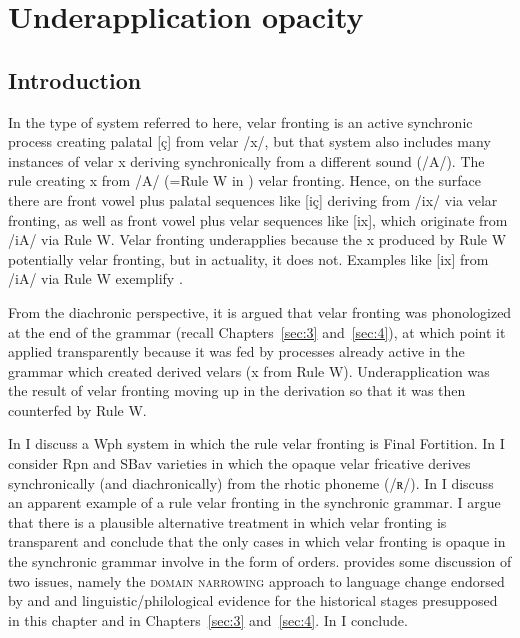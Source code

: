 \chapter{Underapplication opacity}\label{sec:5}

\section{Introduction}\label{sec:5.1}

In the type of system referred to here, velar fronting is an active synchronic process creating palatal [ç] from velar /x/, but that system also includes many instances of velar {\textbar}x{\textbar} deriving synchronically from a different sound (/A/). The rule creating {\textbar}x{\textbar} from /A/ (=Rule W in )  velar fronting. Hence, on the surface there are front vowel plus palatal sequences like [iç] deriving from /ix/ via velar fronting, as well as front vowel plus velar sequences like [ix], which originate from /iA/ via Rule W. Velar fronting underapplies because the {\textbar}x{\textbar} produced by Rule W potentially  velar fronting, but in actuality, it does not. Examples like [ix] from /iA/ via Rule W exemplify  .

From the diachronic perspective, it is argued that velar fronting was phonologized at the end of the grammar (recall Chapters~\ref{sec:3} and~\ref{sec:4}), at which point it applied transparently because it was fed by processes already active in the grammar which created derived velars ({\textbar}x{\textbar} from Rule W). Underapplication  was the result of velar fronting moving up in the derivation so that it was then counterfed by Rule W.

In  I discuss a Wph system in which the rule  velar fronting is Final Fortition. In  I consider Rpn and SBav varieties in which the opaque velar fricative derives synchronically (and diachronically) from the rhotic phoneme (/ʀ/). In  I discuss an apparent example of a rule  velar fronting in the synchronic grammar. I argue that there is a plausible alternative treatment in which velar fronting is transparent and conclude that the only cases in which velar fronting is opaque in the synchronic grammar involve  in the form of  orders.  provides some discussion of two issues, namely the \textsc{domain} \textsc{narrowing} approach to language change endorsed by \citet{Bermúdez-Otero2007,Bermúdez-Otero2015} and \citet{Ramsammy2015} and linguistic/philological evidence for the historical stages presupposed in this chapter and in Chapters~\ref{sec:3} and~\ref{sec:4}. In  I conclude.

